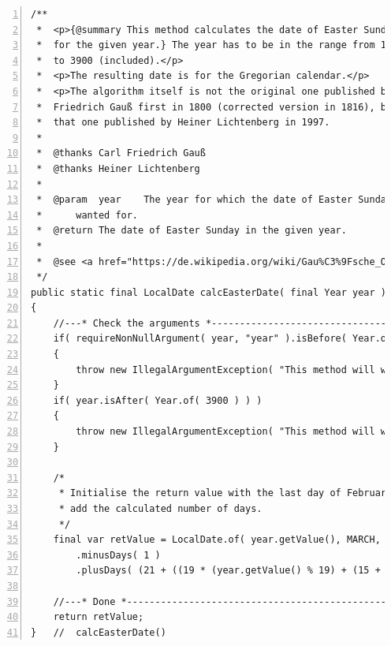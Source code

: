 \documentclass[11pt,a4paper, titlepage, parskip=half, headsepline, footsepline, cleardoublepage=current, headheight=1cm]{scrbook}
\begin{document}
\begin{lstlisting}[numbers=left]
/**
 *  <p>{@summary This method calculates the date of Easter Sunday 
 *  for the given year.} The year has to be in the range from 1583 
 *  to 3900 (included).</p>
 *  <p>The resulting date is for the Gregorian calendar.</p>
 *  <p>The algorithm itself is not the original one published by Carl
 *  Friedrich Gauß first in 1800 (corrected version in 1816), but
 *  that one published by Heiner Lichtenberg in 1997.
 *
 *  @thanks Carl Friedrich Gauß
 *  @thanks Heiner Lichtenberg  
 *
 *  @param  year    The year for which the date of Easter Sunday is 
 *      wanted for.
 *  @return The date of Easter Sunday in the given year.
 *  
 *  @see <a href="https://de.wikipedia.org/wiki/Gau%C3%9Fsche_Osterformel">Gaußsche Osterformel</a>
 */
public static final LocalDate calcEasterDate( final Year year )
{
    //---* Check the arguments *-------------------------------------    
    if( requireNonNullArgument( year, "year" ).isBefore( Year.of( 1583 ) ) )
    {
        throw new IllegalArgumentException( "This method will work only for years greater than or equal to 1583" );
    }
    if( year.isAfter( Year.of( 3900 ) ) )
    {
        throw new IllegalArgumentException( "This method will work only for years less than or equal to 3900" );
    }

    /*
     * Initialise the return value with the last day of February and 
     * add the calculated number of days.
     */
    final var retValue = LocalDate.of( year.getValue(), MARCH, 1 )
        .minusDays( 1 )
        .plusDays( (21 + ((19 * (year.getValue() % 19) + (15 + (3 * (year.getValue() / 100) + 3) / 4 - (8 * (year.getValue() / 100) + 13) / 25)) % 30) - (((19 * (year.getValue() % 19) + (15 + (3 * (year.getValue() / 100) + 3) / 4 - (8 * (year.getValue() / 100) + 13) / 25)) % 30) + (year.getValue() % 19) / 11) / 29) + (7 - ((21 + ((19 * (year.getValue() % 19) + (15 + (3 * (year.getValue() / 100) + 3) / 4 - (8 * (year.getValue() / 100) + 13) / 25)) % 30) - (((19 * (year.getValue() % 19) + (15 + (3 * (year.getValue() / 100) + 3) / 4 - (8 * (year.getValue() / 100) + 13) / 25)) % 30) + (year.getValue() % 19) / 11) / 29) - (7 - (year.getValue() + year.getValue() / 4 + (2 - (3 * (year.getValue() / 100) + 3) % 4)) % 7)) % 7) );

    //---* Done *----------------------------------------------------
    return retValue;
}   //  calcEasterDate()
\end{lstlisting}
\end{document}
